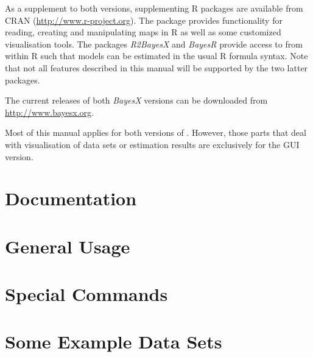 As a supplement to both versions, supplementing R packages are available from CRAN (\href{http://www.r-project.org}{http://www.r-project.org}). The package  \BayesX provides functionality for reading, creating and manipulating maps in R as well as some customized visualisation tools. The packages {\it R2BayesX} and {\it BayesR} provide access to \BayesX from within R such that models can be estimated in the usual R formula syntax. Note that not all features described in this manual will be supported by the two latter packages.

The current releases of both {\em BayesX} versions can be downloaded from \href{http://www.bayesx.org}
{http://www.bayesx.org}.

Most of this manual applies for both versions of \BayesX. However, those parts that deal with visualisation of data sets
or estimation results are exclusively for the GUI version.


\section{Documentation}

\section{General Usage}

\section{Special Commands}

\section{Some Example Data Sets}

